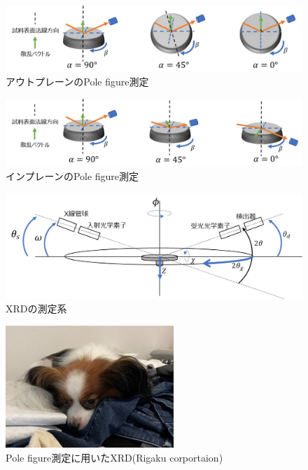 \documentclass[dvipdfmx,12pt,a4paper]{jreport}
\begin{document}
			\begin{figure}[h]
				\centering
				\includegraphics[width=0.9\linewidth]{pole_figure_outplane.jpg}
				\caption{アウトプレーンのPole figure測定}
				\label{Pole_figure_outplane}
			\end{figure}
			\begin{figure}[h]
				\centering
				\includegraphics[width=0.9\linewidth]{pole_figure_inplane.jpg}
				\caption{インプレーンのPole figure測定}
				\label{Pole_figure_inplane}
			\end{figure}
			\begin{figure}[h]
				\centering
				\includegraphics[width=0.9\linewidth]{XRD_配置.jpg}
				\caption{XRDの測定系}
				\label{XRD_配置}
			\end{figure}
			\newpage
			\begin{figure}[h]
				\centering
				\includegraphics{sora.jpg}
				\caption{Pole figure測定に用いたXRD(Rigaku corportaion)}
				\label{XRD_pole_figure}
			\end{figure}
			\newpage
\end{document}
